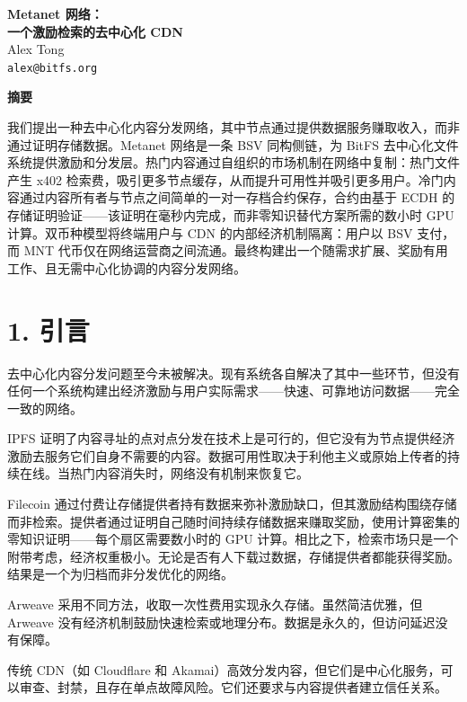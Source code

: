 \documentclass[11pt,a4paper]{article}
\renewenvironment{abstract}{%
  \begin{center}
    \bfseries 摘要
  \end{center}
  \itshape
}{\par\bigskip}
\begin{document}
\begin{center}
  {\LARGE\bfseries Metanet 网络：\\[0.3em]
  一个激励检索的去中心化 CDN}\\[1.5em]
  {\large Alex Tong}\\[0.3em]
  \texttt{alex@bitfs.org}\\[1.5em]
\end{center}

\begin{abstract}
我们提出一种去中心化内容分发网络，其中节点通过提供数据服务赚取收入，而非通过证明存储数据。Metanet 网络是一条 BSV 同构侧链，为 BitFS 去中心化文件系统提供激励和分发层。热门内容通过自组织的市场机制在网络中复制：热门文件产生 x402 检索费，吸引更多节点缓存，从而提升可用性并吸引更多用户。冷门内容通过内容所有者与节点之间简单的一对一存档合约保存，合约由基于 ECDH 的存储证明验证——该证明在毫秒内完成，而非零知识替代方案所需的数小时 GPU 计算。双币种模型将终端用户与 CDN 的内部经济机制隔离：用户以 BSV 支付，而 MNT 代币仅在网络运营商之间流通。最终构建出一个随需求扩展、奖励有用工作、且无需中心化协调的内容分发网络。
\end{abstract}

\section{1. 引言}

去中心化内容分发问题至今未被解决。现有系统各自解决了其中一些环节，但没有任何一个系统构建出经济激励与用户实际需求——快速、可靠地访问数据——完全一致的网络。

IPFS 证明了内容寻址的点对点分发在技术上是可行的，但它没有为节点提供经济激励去服务它们自身不需要的内容。数据可用性取决于利他主义或原始上传者的持续在线。当热门内容消失时，网络没有机制来恢复它。

Filecoin 通过付费让存储提供者持有数据来弥补激励缺口，但其激励结构围绕存储而非检索。提供者通过证明自己随时间持续存储数据来赚取奖励，使用计算密集的零知识证明——每个扇区需要数小时的 GPU 计算。相比之下，检索市场只是一个附带考虑，经济权重极小。无论是否有人下载过数据，存储提供者都能获得奖励。结果是一个为归档而非分发优化的网络。

Arweave 采用不同方法，收取一次性费用实现永久存储。虽然简洁优雅，但 Arweave 没有经济机制鼓励快速检索或地理分布。数据是永久的，但访问延迟没有保障。

传统 CDN（如 Cloudflare 和 Akamai）高效分发内容，但它们是中心化服务，可以审查、封禁，且存在单点故障风险。它们还要求与内容提供者建立信任关系。
\end{document}
